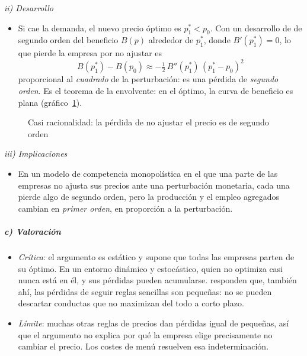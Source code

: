 \documentclass[11pt]{article}
\begin{document}
\hspace*{3.6em}\emph{ii) Desarrollo}

\begin{itemize}
\item Si cae la demanda, el nuevo precio óptimo es $p^*_1<p_0$. Con un desarrollo de  de segundo orden del beneficio $B(p)$ alrededor de $p^*_1$, donde $B'(p^*_1)=0$, lo que pierde la empresa por no ajustar es
  \begin{equation}
  B(p^*_1)-B(p_0)\approx-\tfrac12\,B''(p^*_1)\,(p^*_1-p_0)^2 \label{eq:perdida-segundo-orden}
  \end{equation}
  proporcional al \emph{cuadrado} de la perturbación: es una pérdida de \emph{segundo orden}. Es el teorema de la envolvente: en el óptimo, la curva de beneficio es plana (gráfico~\ref{fig:casi-racionalidad}).
\end{itemize}

\begin{figure}[H]
\centering
\caption{Casi racionalidad: la pérdida de no ajustar el precio es de segundo orden}\label{fig:casi-racionalidad}
\end{figure}

\hspace*{3.6em}\emph{iii) Implicaciones}

\begin{itemize}
\item En un modelo de competencia monopolística en el que una parte de las empresas no ajusta sus precios ante una perturbación monetaria, cada una pierde algo de segundo orden, pero la producción y el empleo agregados cambian en \emph{primer orden}, en proporción a la perturbación.
\end{itemize}

\subparagraph{c) Valoración}

\begin{itemize}
\item \emph{Crítica}: el argumento es estático y supone que todas las empresas parten de su óptimo. En un entorno dinámico y estocástico, quien no optimiza casi nunca está en él, y sus pérdidas pueden acumularse. \textcite{AkerlofYellen1991RuleThumb} responden que, también ahí, las pérdidas de seguir reglas sencillas son pequeñas: no se pueden descartar conductas que no maximizan del todo a corto plazo.
\item \emph{Límite}: muchas otras reglas de precios dan pérdidas igual de pequeñas, así que el argumento no explica por qué la empresa elige precisamente no cambiar el precio\nocite{Romer1993New}. Los costes de menú resuelven esa indeterminación.
\end{itemize}
\end{document}
